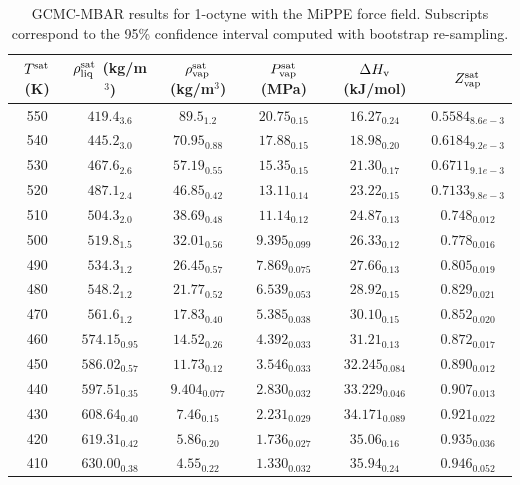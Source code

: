 \documentclass[journal=jctc,manuscript=article]{achemso}
\begin{document}
\begin{table}[htb!]
	\caption{GCMC-MBAR results for 1-octyne with the MiPPE force field. Subscripts correspond to the 95\% confidence interval computed with bootstrap re-sampling.}
	\begin{center}
		\begin{tabular}{|c|c|c|c|c|c|}
			\hline
			$T^{\rm sat}$ (K) & $\rho_{\rm liq}^{\rm sat}$ (kg/m$^3$) & $\rho_{\rm vap}^{\rm sat}$ (kg/m$^3$) & $P_{\rm vap}^{\rm sat}$ (MPa) & $\Delta H_{\rm v}$ (kJ/mol) & $Z_{\rm vap}^{\rm sat}$ \\ \hline
			550 & $419.4_{3.6}$ & $89.5_{1.2}$ & $20.75_{0.15}$ & $16.27_{0.24}$ & $0.5584_{8.6e-3}$ \\
			540 & $445.2_{3.0}$ & $70.95_{0.88}$ & $17.88_{0.15}$ & $18.98_{0.20}$ & $0.6184_{9.2e-3}$ \\
			530 & $467.6_{2.6}$ & $57.19_{0.55}$ & $15.35_{0.15}$ & $21.30_{0.17}$ & $0.6711_{9.1e-3}$ \\
			520 & $487.1_{2.4}$ & $46.85_{0.42}$ & $13.11_{0.14}$ & $23.22_{0.15}$ & $0.7133_{9.8e-3}$ \\
			510 & $504.3_{2.0}$ & $38.69_{0.48}$ & $11.14_{0.12}$ & $24.87_{0.13}$ & $0.748_{0.012}$ \\
			500 & $519.8_{1.5}$ & $32.01_{0.56}$ & $9.395_{0.099}$ & $26.33_{0.12}$ & $0.778_{0.016}$ \\
			490 & $534.3_{1.2}$ & $26.45_{0.57}$ & $7.869_{0.075}$ & $27.66_{0.13}$ & $0.805_{0.019}$ \\
			480 & $548.2_{1.2}$ & $21.77_{0.52}$ & $6.539_{0.053}$ & $28.92_{0.15}$ & $0.829_{0.021}$ \\
			470 & $561.6_{1.2}$ & $17.83_{0.40}$ & $5.385_{0.038}$ & $30.10_{0.15}$ & $0.852_{0.020}$ \\
			460 & $574.15_{0.95}$ & $14.52_{0.26}$ & $4.392_{0.033}$ & $31.21_{0.13}$ & $0.872_{0.017}$ \\
			450 & $586.02_{0.57}$ & $11.73_{0.12}$ & $3.546_{0.033}$ & $32.245_{0.084}$ & $0.890_{0.012}$ \\
			440 & $597.51_{0.35}$ & $9.404_{0.077}$ & $2.830_{0.032}$ & $33.229_{0.046}$ & $0.907_{0.013}$ \\
			430 & $608.64_{0.40}$ & $7.46_{0.15}$ & $2.231_{0.029}$ & $34.171_{0.089}$ & $0.921_{0.022}$ \\
			420 & $619.31_{0.42}$ & $5.86_{0.20}$ & $1.736_{0.027}$ & $35.06_{0.16}$ & $0.935_{0.036}$ \\
			410 & $630.00_{0.38}$ & $4.55_{0.22}$ & $1.330_{0.032}$ & $35.94_{0.24}$ & $0.946_{0.052}$ \\
			\hline
		\end{tabular}
	\end{center}
\end{table}
\end{document}
